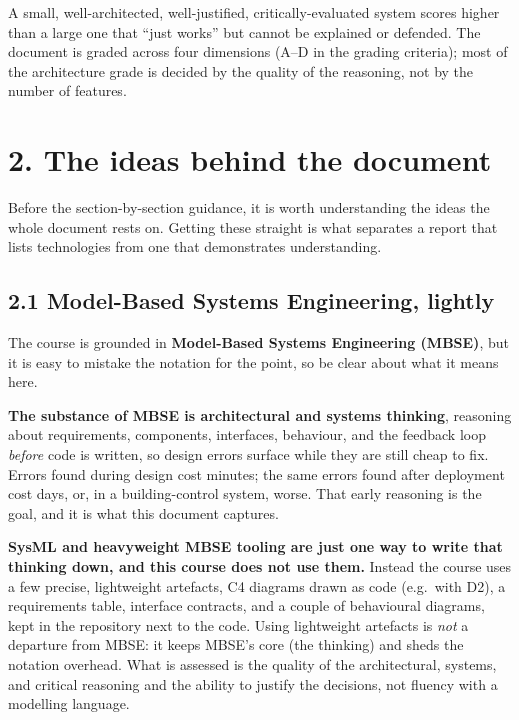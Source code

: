 \documentclass[
  11pt,
]{article}
\begin{document}
A small, well-architected, well-justified, critically-evaluated system
scores higher than a large one that ``just works'' but cannot be
explained or defended. The document is graded across four dimensions
(A--D in the grading criteria); most of the architecture grade is
decided by the quality of the reasoning, not by the number of features.

\hypertarget{the-ideas-behind-the-document}{%
\section{2. The ideas behind the
document}\label{the-ideas-behind-the-document}}

Before the section-by-section guidance, it is worth understanding the
ideas the whole document rests on. Getting these straight is what
separates a report that lists technologies from one that demonstrates
understanding.

\hypertarget{model-based-systems-engineering-lightly}{%
\subsection{2.1 Model-Based Systems Engineering,
lightly}\label{model-based-systems-engineering-lightly}}

The course is grounded in \textbf{Model-Based Systems Engineering
(MBSE)}, but it is easy to mistake the notation for the point, so be
clear about what it means here.

\textbf{The substance of MBSE is architectural and systems thinking}, reasoning about requirements, components, interfaces, behaviour, and the
feedback loop \emph{before} code is written, so design errors surface
while they are still cheap to fix. Errors found during design cost
minutes; the same errors found after deployment cost days, or, in a
building-control system, worse. That early reasoning is the goal, and
it is what this document captures.

\textbf{SysML and heavyweight MBSE tooling are just one way to write
that thinking down, and this course does not use them.} Instead the course uses a few precise, lightweight artefacts, C4 diagrams drawn as code (e.g.\
with D2), a requirements table, interface contracts, and a couple of behavioural
diagrams, kept in the repository next to the code. Using lightweight
artefacts is \emph{not} a departure from MBSE: it keeps MBSE's core (the
thinking) and sheds the notation overhead. What is assessed is the quality of the architectural, systems, and critical reasoning and the ability to justify the decisions, not fluency with a modelling
language.
\end{document}
